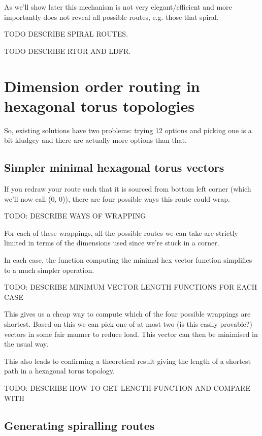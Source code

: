 			As we'll show later this mechanism is not very elegant/efficient and more
			importantly does not reveal all possible routes, e.g. those that spiral.
			
			TODO DESCRIBE SPIRAL ROUTES.
			
			TODO DESCRIBE RTOR AND LDFR.
		
	\section{Dimension order routing in hexagonal torus topologies}
		
		So, existing solutions have two problems: trying 12 options and picking one
		is a bit kludgey and there are actually more options than that.
		
		\subsection{Simpler minimal hexagonal torus vectors}
			
			If you redraw your route such that it is sourced from bottom left corner
			(which we'll now call (0, 0)), there are four possible ways this route
			could wrap.
			
			TODO: DESCRIBE WAYS OF WRAPPING
			
			For each of these wrappings, all the possible routes we can take are
			strictly limited in terms of the dimensions used since we're stuck in a
			corner.
			
			In each case, the function computing the minimal hex vector function
			simplifies to a much simpler operation.
			
			TODO: DESCRIBE MINIMUM VECTOR LENGTH FUNCTIONS FOR EACH CASE
			
			This gives us a cheap way to compute which of the four possible wrappings
			are shortest. Based on this we can pick one of at most two (is this
			easily provable?) vectors in some fair manner to reduce load. This vector
			can then be minimised in the usual way.
			
			This also leads to confirming a theoretical result giving the length of a
			shortest path in a hexagonal torus topology.
			
			TODO: DESCRIBE HOW TO GET LENGTH FUNCTION AND COMPARE WITH \cite{xiao04}
		
		\subsection{Generating spiralling routes}
			
